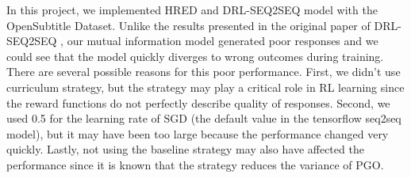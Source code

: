 In this project, we implemented HRED and DRL-SEQ2SEQ model with the OpenSubtitle Dataset. Unlike the results presented in the original paper of DRL-SEQ2SEQ \cite{Li}, our mutual information model generated poor responses and we could see that the model quickly diverges to wrong outcomes during training. There are several possible reasons for this poor performance. First, we didn't use curriculum strategy, but the strategy may play a critical role in RL learning since the reward functions do not perfectly describe quality of responses. Second, we used 0.5 for the learning rate of SGD (the default value in the tensorflow seq2seq model), but it may have been too large because the performance changed very quickly. Lastly, not using the baseline strategy may also have affected the performance since it is known that the strategy reduces the variance of PGO.